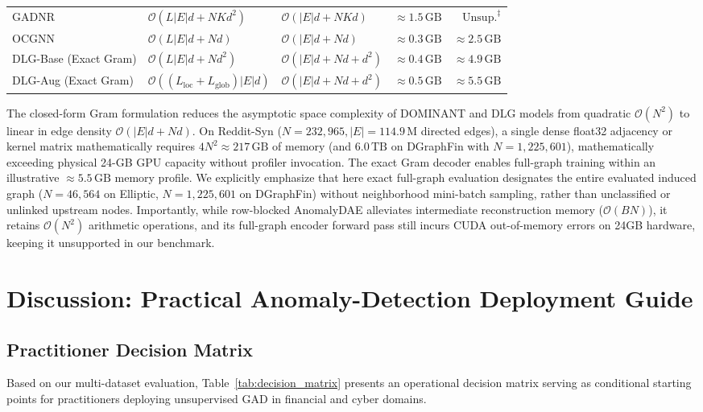 \documentclass[11pt,a4paper]{article}
\begin{document}
\begin{table}[htbp]
\begin{tabularx}{\textwidth}{lXXrr}
GADNR & $\mathcal{O}(L |E| d + N K d^2)$ & $\mathcal{O}(|E| d + N K d)$ & $\approx 1.5\,\mathrm{GB}$ & $\mathrm{Unsup.}^\ddagger$ \\
OCGNN & $\mathcal{O}(L |E| d + N d)$ & $\mathcal{O}(|E| d + N d)$ & $\approx 0.3\,\mathrm{GB}$ & $\approx 2.5\,\mathrm{GB}$ \\
DLG-Base (Exact Gram) & $\mathcal{O}(L |E| d + N d^2)$ & $\mathcal{O}(|E| d + N d + d^2)$ & $\approx 0.4\,\mathrm{GB}$ & $\approx 4.9\,\mathrm{GB}$ \\
DLG-Aug (Exact Gram) & $\mathcal{O}((L_{\mathrm{loc}} + L_{\mathrm{glob}}) |E| d)$ & $\mathcal{O}(|E| d + N d + d^2)$ & $\approx 0.5\,\mathrm{GB}$ & $\approx 5.5\,\mathrm{GB}$ \\\bottomrule
\end{tabularx}
\end{table}

The closed-form Gram formulation reduces the asymptotic space complexity of DOMINANT and DLG models from quadratic $\mathcal{O}(N^2)$ to linear in edge density $\mathcal{O}(|E| d + N d)$. On Reddit-Syn ($N=232,965, |E|=114.9\,\mathrm{M}$ directed edges), a single dense float32 adjacency or kernel matrix mathematically requires $4 N^2 \approx 217\,\mathrm{GB}$ of memory (and $6.0\,\mathrm{TB}$ on DGraphFin with $N=1,225,601$), mathematically exceeding physical 24-GB GPU capacity without profiler invocation. The exact Gram decoder enables full-graph training within an illustrative $\approx 5.5\,\mathrm{GB}$ memory profile. We explicitly emphasize that here exact full-graph evaluation designates the entire evaluated induced graph ($N=46,564$ on Elliptic, $N=1,225,601$ on DGraphFin) without neighborhood mini-batch sampling, rather than unclassified or unlinked upstream nodes. Importantly, while row-blocked AnomalyDAE alleviates intermediate reconstruction memory ($\mathcal{O}(B N)$), it retains $\mathcal{O}(N^2)$ arithmetic operations, and its full-graph encoder forward pass still incurs CUDA out-of-memory errors on 24GB hardware, keeping it unsupported in our benchmark.

\section{Discussion: Practical Anomaly-Detection Deployment Guide}
\label{sec:discussion}

\subsection{Practitioner Decision Matrix}
Based on our multi-dataset evaluation, Table~\ref{tab:decision_matrix} presents an operational decision matrix serving as conditional starting points for practitioners deploying unsupervised GAD in financial and cyber domains.
\end{document}
